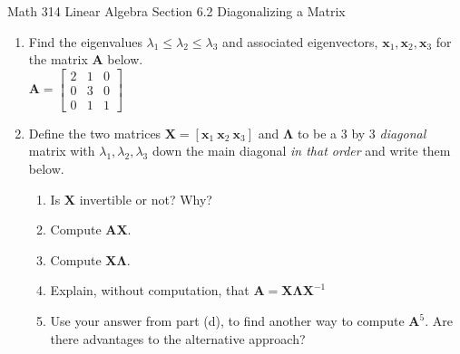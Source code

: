 \documentclass[12pt]{amsart}
\newcommand{\bA}{\mathbf{A}}
\newcommand{\bX}{\mathbf{X}}
\newcommand{\bL}{\mathbf{\Lambda}}
\newcommand{\bx}{\mathbf{x}}
\begin{document}
\scriptsize \noindent Math 314 Linear Algebra \hfill Section 6.2 Diagonalizing a Matrix 
\normalsize\medskip


\thispagestyle{empty}
\begin{enumerate}
\item Find the eigenvalues $\lambda_1 \leq \lambda_2 \leq \lambda_3$ and associated eigenvectors, $\bx_1,\bx_2,\bx_3$ for the matrix $\bA$ below.  \\

$\bA =  \begin{bmatrix} 2&1&0\\ 0&3&0\\0&1&1 \end{bmatrix} $
\vfill
\newpage
\item Define the two matrices $\bX = [ \bx_1\: \bx_2\: \bx_3]$ and $\bL$ to be a 3 by 3 \emph{diagonal} matrix with $\lambda_1,\lambda_2,\lambda_3$ down the main diagonal \emph{in that order} and write them below.\\
\vfill
	\begin{enumerate}
	\item Is $\bX$ invertible or not? Why?
	\vfill
	\item Compute $\bA \bX.$
	\vfill
	\item Compute $\bX \bL.$
	\vfill
	\item Explain, without computation, that $\bA=\bX \bL \bX^{-1}$
	\vfill
	\item Use your answer from part (d), to find another way to compute $\bA^5.$ Are there advantages to the alternative approach?
	\vfill
	\end{enumerate}
\end{enumerate}
\end{document}
